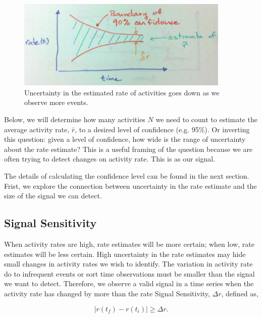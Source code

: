 \documentclass{article}
\begin{document}
%
\begin{figure}[h]
	\begin{center}
		\includegraphics[width=4.0in]{./imgs/confidence.jpg}
	\end{center}
	\caption{Uncertainty in the estimated rate of activities goes down as we observe more events. }
    	\label{fig:confidence}
\end{figure}
%
%

Below, we will determine how many activities $N$ we need to count to estimate the average activity rate, $\bar{r}$, to a desired level
of confidence (e.g. 95\%). Or inverting this question: given a level of confidence, how wide is the range of uncertainty
about the rate estimate?  This is a useful framing of the question because we are often trying to detect changes on activity rate. This is as our
signal. 

The details of calculating the confidence level can be found in the next section.  Frist, we explore the connection between uncertainty in the rate estimate and the size of the signal we can detect.

\subsection{Signal Sensitivity}

When activity rates are high, rate estimates will be more certain; when low, rate estimates will be less certain. High uncertainty in the rate estimates may hide small changes in activity rates we wish to identify.  The variation in activity rate do to infrequent events or sort time observations must be smaller than the signal we want to detect.
Therefore, we observe a valid signal in a time series when the activity rate has changed by more than the rate Signal Sensitivity, $\Delta r$, defined as,

\begin{equation}
    \label{eq:signal}
    | r(t_f) - r(t_i) | \geq \Delta r.
\end{equation}
\end{document}
